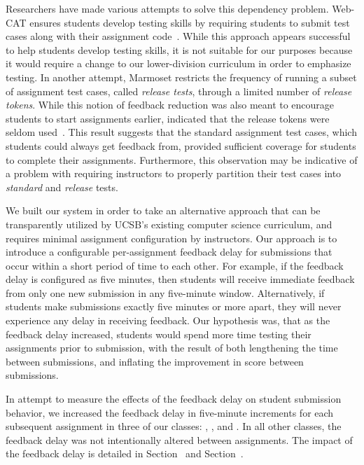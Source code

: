 Researchers have made various attempts to solve this dependency
problem. Web-CAT ensures students develop testing skills by requiring students
to submit test cases along with their assignment
code~\cite{Edwards:2003:RCS:949344.949390}. While this approach appears
successful to help students develop testing skills, it is not suitable for our
purposes because it would require a change to our lower-division curriculum in
order to emphasize testing. In another attempt, Marmoset restricts the
frequency of running a subset of assignment test cases, called \emph{release
  tests}, through a limited number of \emph{release tokens}. While this notion
of feedback reduction was also meant to encourage students to start assignments
earlier, \spacco{} indicated that the release tokens were seldom
used~\cite{Spacco:2013:TIP:2462476.2465594}. This result suggests that the
standard assignment test cases, which students could always get feedback from,
provided sufficient coverage for students to complete their
assignments. Furthermore, this observation may be indicative of a problem with
requiring instructors to properly partition their test cases into
\emph{standard} and \emph{release} tests.

We built our system in order to take an alternative approach that can be
transparently utilized by UCSB's existing computer science curriculum, and
requires minimal assignment configuration by instructors. Our approach is to
introduce a configurable per-assignment feedback delay for submissions that
occur within a short period of time to each other. For example, if the feedback
delay is configured as five minutes, then students will receive immediate
feedback from only one new submission in any five-minute window. Alternatively,
if students make submissions exactly five minutes or more apart, they will
never experience any delay in receiving feedback. Our hypothesis was, that as
the feedback delay increased, students would spend more time testing their
assignments prior to submission, with the result of both lengthening the time
between submissions, and inflating the improvement in score between
submissions.

In attempt to measure the effects of the feedback delay on student submission
behavior, we increased the feedback delay in five-minute increments for each
subsequent assignment in three of our classes: , , and
. In all other classes, the feedback delay was not intentionally
altered between assignments. The impact of the feedback delay is detailed in
Section~ and Section~.


